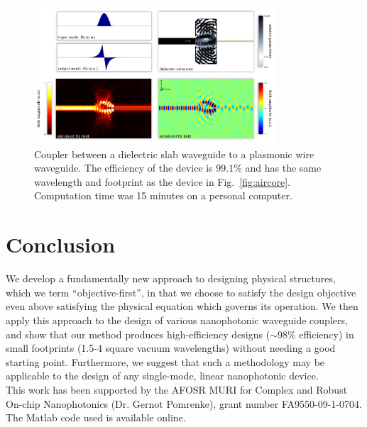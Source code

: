 \begin{figure}[htb]
    \centering
    \includegraphics[width=0.8\textwidth]{p3/5}
    \caption{Coupler between a dielectric slab waveguide to 
            a plasmonic wire waveguide.
        The efficiency of the device is $99.1\%$ and 
            has the same wavelength and footprint as the device in
            Fig.~\ref{fig:aircore}.
        Computation time was 15 minutes on a personal computer.
        }
        \label{fig:wire}
\end{figure}
\clearpage

\section{Conclusion}
We develop a fundamentally new approach to designing physical structures,
    which we term ``objective-first'', 
    in that we choose to satisfy the design objective 
    even above satisfying the physical equation which governs its operation.
We then apply this approach to the design of 
    various nanophotonic waveguide couplers,
    and show that our method produces
    high-efficiency designs ($\sim 98\%$ efficiency) 
    in small footprints (1.5-4 square vacuum wavelengths)
    without needing a good starting point.
Furthermore, we suggest that such a methodology may be applicable
    to the design of any single-mode, linear nanophotonic device.\\

This work has been supported by the 
    AFOSR MURI for Complex and Robust On-chip Nanophotonics 
    (Dr. Gernot Pomrenke), grant number FA9550-09-1-0704.
The Matlab code used is available online\cite{code}.
